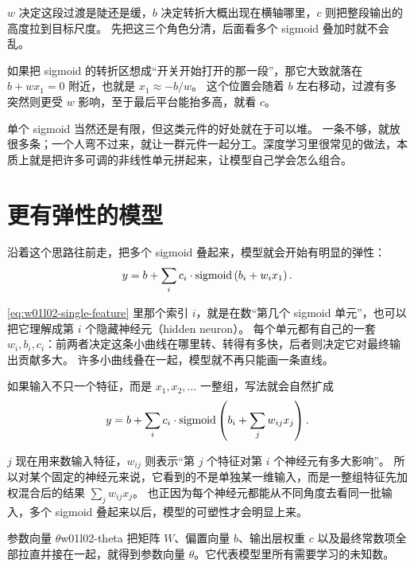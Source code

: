 \documentclass[main.tex]{subfiles}
\begin{document}
$w$ 决定这段过渡是陡还是缓，$b$ 决定转折大概出现在横轴哪里，$c$ 则把整段输出的高度拉到目标尺度。
先把这三个角色分清，后面看多个 sigmoid 叠加时就不会乱。

\begin{examplebox}
如果把 sigmoid 的转折区想成“开关开始打开的那一段”，那它大致就落在 $b+wx_1=0$ 附近，也就是 $x_1 \approx -b/w$。
这个位置会随着 $b$ 左右移动，过渡有多突然则更受 $w$ 影响，至于最后平台能抬多高，就看 $c$。
\end{examplebox}

单个 sigmoid 当然还是有限，但这类元件的好处就在于可以堆。
一条不够，就放很多条；一个人弯不过来，就让一群元件一起分工。深度学习里很常见的做法，本质上就是把许多可调的非线性单元拼起来，让模型自己学会怎么组合。

\section{更有弹性的模型}
\label{sec:w01l02-flexible-model}

沿着这个思路往前走，把多个 sigmoid 叠起来，模型就会开始有明显的弹性：
\begin{equation}
  y = b + \sum_i c_i \cdot \operatorname{sigmoid}\left( b_i + w_i x_1 \right).
  \label{eq:w01l02-single-feature}
\end{equation}

\cref{eq:w01l02-single-feature} 里那个索引 $i$，就是在数“第几个 sigmoid 单元”，也可以把它理解成第 $i$ 个隐藏神经元（hidden neuron）。
每个单元都有自己的一套 $w_i,b_i,c_i$：前两者决定这条小曲线在哪里转、转得有多快，后者则决定它对最终输出贡献多大。
许多小曲线叠在一起，模型就不再只能画一条直线。

如果输入不只一个特征，而是 $x_1,x_2,\dots$ 一整组，写法就会自然扩成
\begin{equation}
  y = b + \sum_i c_i \cdot \operatorname{sigmoid}\left( b_i + \sum_j w_{ij}x_j \right).
  \label{eq:w01l02-multi-feature}
\end{equation}

$j$ 现在用来数输入特征，$w_{ij}$ 则表示“第 $j$ 个特征对第 $i$ 个神经元有多大影响”。
所以对某个固定的神经元来说，它看到的不是单独某一维输入，而是一整组特征先加权混合后的结果 $\sum_j w_{ij}x_j$。
也正因为每个神经元都能从不同角度去看同一批输入，多个 sigmoid 叠起来以后，模型的可塑性才会明显上来。

\begin{notation}{参数向量 $\theta$}{w01l02-theta}
把矩阵 $W$、偏置向量 $b$、输出层权重 $c$ 以及最终常数项全部拉直并接在一起，就得到参数向量 $\theta$。它代表模型里所有需要学习的未知数。
\end{notation}
\end{document}
